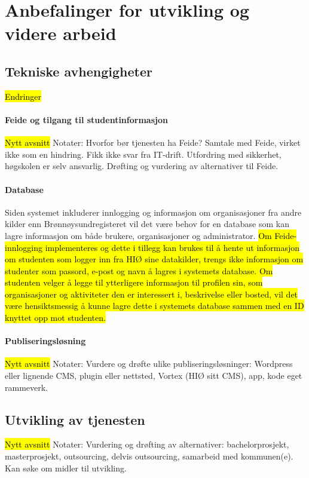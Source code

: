 \section{Anbefalinger for utvikling og videre arbeid}
\label{section:anbefaling-videre-utvikling}

\subsection{Tekniske avhengigheter}
\hl{Endringer}

\paragraph{Feide og tilgang til studentinformasjon}
\hl{Nytt avsnitt}
Notater:
Hvorfor bør tjenesten ha Feide?
Samtale med Feide, virket ikke som en hindring.
Fikk ikke svar fra IT-drift.
Utfordring med sikkerhet, høgskolen er selv ansvarlig.
Drøfting og vurdering av alternativer til Feide.

\paragraph{Database}
Siden systemet inkluderer innlogging og informasjon om organisasjoner fra andre kilder enn Brønnøysundregisteret vil det være behov for en database som kan lagre informasjon om både brukere, organisasjoner og administrator. \hl{Om Feide-innlogging implementeres og dette i tillegg kan brukes til å hente ut informasjon om studenten som logger inn fra HIØ sine datakilder, trengs ikke informasjon om studenter som passord, e-post og navn å lagres i systemets database. Om studenten velger å legge til ytterligere informasjon til profilen sin, som organisasjoner og aktiviteter den er interessert i, beskrivelse eller bosted, vil det være hensiktsmessig å kunne lagre dette i systemets database sammen med en ID knyttet opp mot studenten.}

\paragraph{Publiseringsløsning}
\hl{Nytt avsnitt}
Notater:
Vurdere og drøfte ulike publiseringsløsninger: Wordpress eller lignende CMS, plugin eller nettsted, Vortex (HIØ sitt CMS), app, kode eget rammeverk.

\subsection{Utvikling av tjenesten}
\hl{Nytt avsnitt}
Notater:
Vurdering og drøfting av alternativer: bachelorprosjekt, masterprosjekt, outsourcing, delvis outsourcing, samarbeid med kommunen(e).
Kan søke om midler til utvikling.

